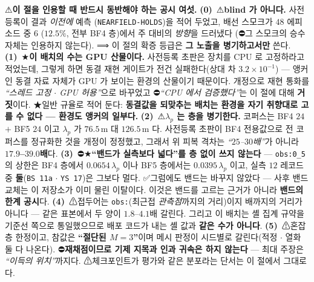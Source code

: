 \documentclass[11pt]{report}
\numberwithin{equation}{chapter}
\numberwithin{figure}{chapter}
\numberwithin{table}{chapter}
\begin{document}
⚠\textbf{이 절을 인용할 때 반드시 동반해야 하는 공시 여섯.}
\textbf{(0)}~⚠\textbf{blind 가 아니다.} 사전등록이 결과 \emph{이전에} 예측
(\texttt{NEARFIELD-HOLDS})을 적어 두었고, 배선 스모크가 $48$ 에피소드 중 $6$
($12.5\%$, 전부 BF4 층)에서 주 대비의 \emph{방향}을 드러냈다
(⛔그 스모크의 승수 자체는 인용하지 않는다). ⟹ 이 절의 확증 등급은
\textbf{그 노출을 병기하고서만} 쓴다.
\textbf{(1)}~★\textbf{이 배치의 수는 GPU 산물이다.} 사전등록 초판은 장치를 CPU 로
고정하라고 적었는데, 그렇게 하면 동결 재현 게이트가 전건 실패한다(상대 차
$3.2\times10^{-1}$) --- 앵커인 동결 자료 자체가 GPU 가 보이는 환경의 산물이기 때문이다.
개정으로 재현 통화를 \emph{``스레드 고정 $\cdot$ GPU 허용''}으로 바꾸었고
⛔\emph{``CPU 에서 검증했다''}는 이 절에 대해 \textbf{거짓}이다. ★일반 규율로 적어 둔다:
\textbf{동결값을 되맞추는 배치는 환경을 자기 취향대로 고를 수 없다 --- 환경도 앵커의
일부다.}
\textbf{(2)}~⚠\textbf{$\lambda_p$ 는 층을 병기한다.} 코퍼스는 BF4 $24$ $+$ BF5 $24$ 이고
$\lambda_p$ 가 $76.5$\,m 대 $126.5$\,m 다. 사전등록 초판이 BF4 전용값으로 전 코퍼스를
정규화한 것을 개정이 정정했고, 그래서 위 피복 격차는 \emph{``$25$--$30$배''}가 아니라
\textbf{$17.9$--$39.0$배}다.
\textbf{(3)}~⛔★\textbf{``밴드가 실측보다 넓다''를 층 없이 쓰지 않는다} ---
\texttt{obs:0\_5} 의 상한은 BF4 층에서 $0.0654\,\lambda_p$ 이나 BF5 층에서는
$0.0395\,\lambda_p$ 이고, 실측 $12$ 레코드 중 \textbf{둘}(\texttt{BS\,11a} $\cdot$
\texttt{YS\,17})은 그보다 멀다. ✅그럼에도 밴드는 바꾸지 않았다 --- 사후 밴드 교체는 이
저장소가 이미 물린 이탈이다. 이것은 밴드를 고르는 근거가 아니라 \textbf{밴드의 한계
공시}다.
\textbf{(4)}~⚠접두어는 \texttt{obs:}(최근접 \emph{관측점}까지의 거리)이지 배까지의
거리가 아니다 --- 같은 표본에서 두 양이 $1.8$--$4.1$배 갈린다. 그리고 이 배치는 셸 집계
규약을 기준선 쪽으로 통일했으므로 배포 코드가 내는 셸 값과 \textbf{같은 수가 아니다}.
\textbf{(5)}~⚠혼잡 층 한정이고, 참값은 \textbf{``절단된 $M{=}3$''}이며 메시 판정이
시드별로 갈린다(적정 $\cdot$ 열화 둘 다 나온다). ⛔\textbf{재채점이므로 기제 지목과 인과
귀속은 하지 않는다} --- 최대 주장은 \emph{``이득의 위치''}까지다. ⚠체크포인트가 평가와
같은 분포라는 단서는 이 절에서 그대로다.
\end{document}
